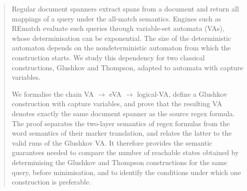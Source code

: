 
\begin{abstract}
Regular document spanners extract spans from a document and return all
mappings of a query under the all-match semantics. Engines such as
REmatch evaluate such queries through variable-set automata (VAs),
whose determinisation can be exponential. The size of the deterministic
automaton depends on the nondeterministic automaton from which the
construction starts. We study this dependency for two classical
constructions, Glushkov and Thompson, adapted to automata with capture
variables.

We formalise the chain VA $\to$ eVA $\to$ logical-VA, define a Glushkov
construction with capture variables, and prove that the resulting VA
denotes exactly the same document spanner as the source regex formula.
The proof separates the two-layer semantics of regex formulas from the
word semantics of their marker translation, and relates the latter to
the valid runs of the Glushkov VA. It therefore provides the semantic
guarantees needed to compare the number of reachable states obtained by
determinising the Glushkov and Thompson constructions for the same
query, before minimisation, and to identify the conditions under which
one construction is preferable.
\end{abstract}
